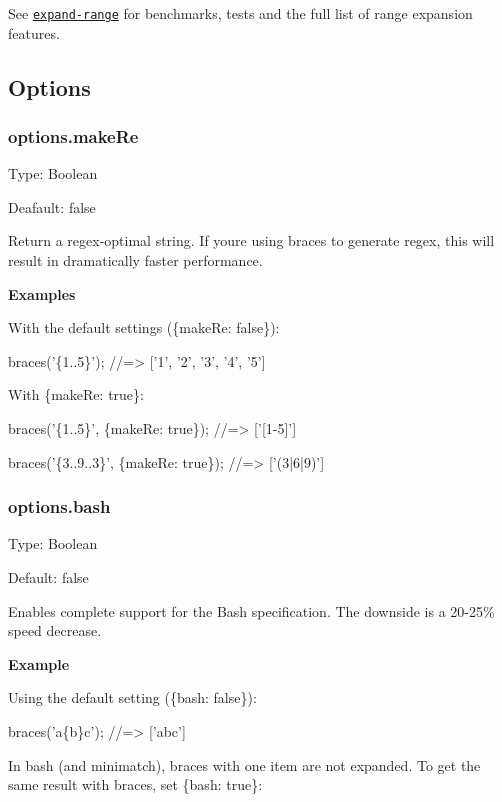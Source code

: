 See \href{https://github.com/jonschlinkert/expand-range}{\tt expand-\/range} for benchmarks, tests and the full list of range expansion features.

\subsection*{Options}

\subsubsection*{options.\+make\+Re}

Type\+: {\ttfamily Boolean}

Deafault\+: {\ttfamily false}

Return a regex-\/optimal string. If you\textquotesingle{}re using braces to generate regex, this will result in dramatically faster performance.

{\bfseries Examples}

With the default settings ({\ttfamily \{make\+Re\+: false\}})\+:


\begin{DoxyCode}
braces('\{1..5\}');
//=> ['1', '2', '3', '4', '5']
\end{DoxyCode}


With {\ttfamily \{make\+Re\+: true\}}\+:


\begin{DoxyCode}
braces('\{1..5\}', \{makeRe: true\});
//=> ['[1-5]']

braces('\{3..9..3\}', \{makeRe: true\});
//=> ['(3|6|9)']
\end{DoxyCode}


\subsubsection*{options.\+bash}

Type\+: {\ttfamily Boolean}

Default\+: {\ttfamily false}

Enables complete support for the Bash specification. The downside is a 20-\/25\% speed decrease.

{\bfseries Example}

Using the default setting ({\ttfamily \{bash\+: false\}})\+:


\begin{DoxyCode}
braces('a\{b\}c');
//=> ['abc']
\end{DoxyCode}


In bash (and minimatch), braces with one item are not expanded. To get the same result with braces, set {\ttfamily \{bash\+: true\}}\+:


